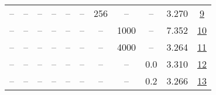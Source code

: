 \begin{table}[H]
\begin{tabular}{ccccccccccc}
-- & -- & -- & -- & -- & -- & 256 & -- & -- & 3.270 & \href{https://wandb.ai/stanford-mercury/optimizer-scaling/runs/sweep-300m-6B-cautiousad730alr0.008-wd0.1-minlr0-warmup2000-b10.-315f4b}{9} \\
-- & -- & -- & -- & -- & -- & -- & 1000 & -- & 7.352 & \href{https://wandb.ai/stanford-mercury/optimizer-scaling/runs/sweep-300m-6B-cautiousc544aalr0.008-wd0.1-minlr0-warmup1000-b10.-0836a5}{10} \\
-- & -- & -- & -- & -- & -- & -- & 4000 & -- & 3.264 & \href{https://wandb.ai/stanford-mercury/optimizer-scaling/runs/sweep-300m-6B-cautious71139elr0.008-wd0.1-minlr0-warmup4000-b10.-6dedda}{11} \\
-- & -- & -- & -- & -- & -- & -- & -- & 0.0 & 3.310 & \href{https://wandb.ai/stanford-mercury/optimizer-scaling/runs/sweep-300m-6B-cautiousb3e078lr0.008-wd0-minlr0-warmup2000-b10.98-838b4c}{12} \\
-- & -- & -- & -- & -- & -- & -- & -- & 0.2 & 3.266 & \href{https://wandb.ai/stanford-mercury/optimizer-scaling/runs/sweep-300m-6B-cautious732329lr0.008-wd0.2-minlr0-warmup2000-b10.-3827e5}{13} \\
\bottomrule
\end{tabular}
\end{table}

